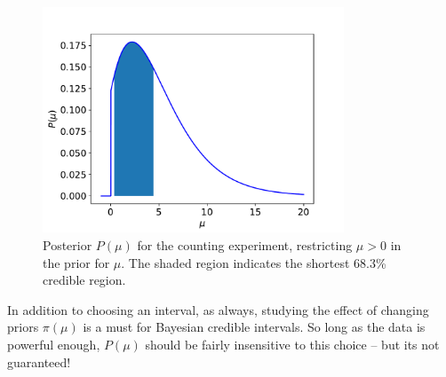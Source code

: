 \begin{figure}[hbt!]
    \centering
    \includegraphics[width=0.8\textwidth]{figures/Intervals/credible_interval.pdf}
    \caption{Posterior $P(\mu)$ for the counting experiment, restricting $\mu>0$ in the prior for $\mu$. The shaded region indicates the shortest 68.3\% credible region.  }
    \label{fig:posterior_shortest_interval}
\end{figure}

In addition to choosing an interval, as always, studying the effect of changing priors $\pi(\mu)$ is a must for Bayesian credible intervals. So long as the data is powerful enough, $P(\mu)$ should be fairly insensitive to this choice -- but its not guaranteed! 
